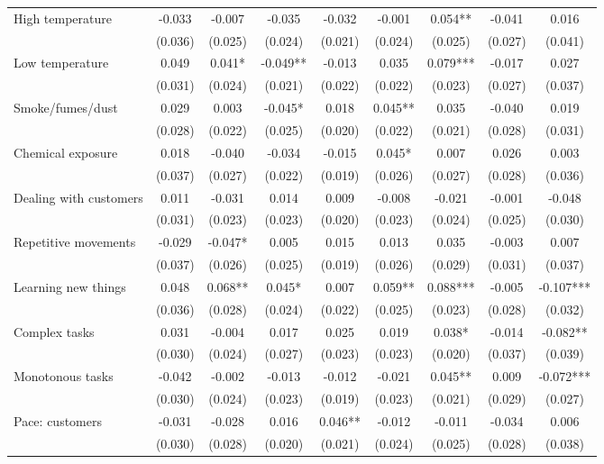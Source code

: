 \begin{table}[htbp]
\begin{threeparttable}
\begin{tabular}{l cccc cccc}
High temperature & -0.033 & -0.007 & -0.035 & -0.032 & -0.001 & 0.054** & -0.041 & 0.016 \\
 & (0.036) & (0.025) & (0.024) & (0.021) & (0.024) & (0.025) & (0.027) & (0.041) \\[3pt]
Low temperature & 0.049 & 0.041* & -0.049** & -0.013 & 0.035 & 0.079*** & -0.017 & 0.027 \\
 & (0.031) & (0.024) & (0.021) & (0.022) & (0.022) & (0.023) & (0.027) & (0.037) \\[3pt]
Smoke/fumes/dust & 0.029 & 0.003 & -0.045* & 0.018 & 0.045** & 0.035 & -0.040 & 0.019 \\
 & (0.028) & (0.022) & (0.025) & (0.020) & (0.022) & (0.021) & (0.028) & (0.031) \\[3pt]
Chemical exposure & 0.018 & -0.040 & -0.034 & -0.015 & 0.045* & 0.007 & 0.026 & 0.003 \\
 & (0.037) & (0.027) & (0.022) & (0.019) & (0.026) & (0.027) & (0.028) & (0.036) \\[3pt]
Dealing with customers & 0.011 & -0.031 & 0.014 & 0.009 & -0.008 & -0.021 & -0.001 & -0.048 \\
 & (0.031) & (0.023) & (0.023) & (0.020) & (0.023) & (0.024) & (0.025) & (0.030) \\[3pt]
Repetitive movements & -0.029 & -0.047* & 0.005 & 0.015 & 0.013 & 0.035 & -0.003 & 0.007 \\
 & (0.037) & (0.026) & (0.025) & (0.019) & (0.026) & (0.029) & (0.031) & (0.037) \\[3pt]
Learning new things & 0.048 & 0.068** & 0.045* & 0.007 & 0.059** & 0.088*** & -0.005 & -0.107*** \\
 & (0.036) & (0.028) & (0.024) & (0.022) & (0.025) & (0.023) & (0.028) & (0.032) \\[3pt]
Complex tasks & 0.031 & -0.004 & 0.017 & 0.025 & 0.019 & 0.038* & -0.014 & -0.082** \\
 & (0.030) & (0.024) & (0.027) & (0.023) & (0.023) & (0.020) & (0.037) & (0.039) \\[3pt]
Monotonous tasks & -0.042 & -0.002 & -0.013 & -0.012 & -0.021 & 0.045** & 0.009 & -0.072*** \\
 & (0.030) & (0.024) & (0.023) & (0.019) & (0.023) & (0.021) & (0.029) & (0.027) \\[3pt]
Pace: customers & -0.031 & -0.028 & 0.016 & 0.046** & -0.012 & -0.011 & -0.034 & 0.006 \\
 & (0.030) & (0.028) & (0.020) & (0.021) & (0.024) & (0.025) & (0.028) & (0.038) \\[3pt]

\end{tabular}
\end{threeparttable}
\end{table}
